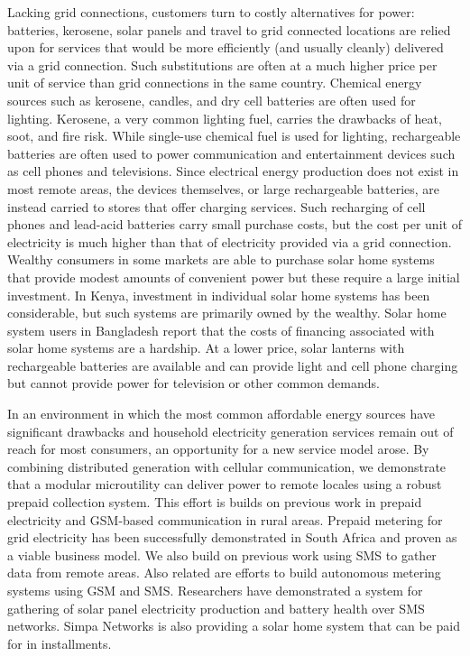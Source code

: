 \documentclass{sig-alternate}
\begin{document}
Lacking grid connections, customers turn to costly alternatives for
power: batteries, kerosene, solar panels and travel to grid connected
locations are relied upon for services that would be more efficiently
(and usually cleanly) delivered via a grid connection.
Such substitutions are often at a much higher price per unit of service
than grid connections in the same country.\cite{Mills:Specter,
Dutt:2004, vanderPlas:1988}
Chemical energy sources such as kerosene, candles, and dry cell batteries
are often used for lighting.
Kerosene, a very common lighting fuel, carries the drawbacks of heat,
soot, and fire risk.
While single-use chemical fuel is used for lighting, rechargeable
batteries are often used to power communication and entertainment devices
such as cell phones and televisions.
Since electrical energy production does not exist in most remote areas,
the devices themselves, or large rechargeable batteries, are instead
carried to stores that offer charging services.
Such recharging of cell phones and lead-acid batteries carry small
purchase costs, but the cost per unit of electricity is much higher than
that of electricity provided via a grid connection.
Wealthy consumers in some markets are able to purchase
solar home systems that provide modest amounts of convenient
power but these require a large initial investment.
In Kenya, investment in individual solar home systems has been
considerable, but such systems are primarily owned by the
wealthy.\cite{Jacobson:Connective}
Solar home system users in Bangladesh report that the costs of financing
associated with solar home systems are a hardship.\cite{Mondal:SHSBangladesh:2011}
At a lower price, solar lanterns with rechargeable batteries are available
and can provide light and cell phone charging but cannot provide 
power for television or other common demands.

In an environment in which the most common affordable energy sources
have significant drawbacks and household electricity generation
services remain out of reach for most consumers, an opportunity for a
new service model arose.
By combining distributed generation with cellular communication, we
demonstrate that a modular microutility can deliver power to remote
locales using a robust prepaid collection system.
This effort is builds on previous work in prepaid electricity and
GSM-based communication in rural areas.
Prepaid metering for grid electricity has been successfully demonstrated
in South Africa and proven as a viable business model.\cite{Tewari:2003}
We also build on previous work using SMS to gather data from remote
areas.\cite{RapidSMS, Hartung:2010}
Also related are efforts to build autonomous metering systems using GSM
and SMS.\cite{Ramamurthy:2010}
Researchers have demonstrated a system for gathering of solar panel
electricity production and battery health over SMS networks.\cite{SimbaLink}
Simpa Networks is also providing a solar home system that can be
paid for in installments.\cite{Simpa}
\end{document}
